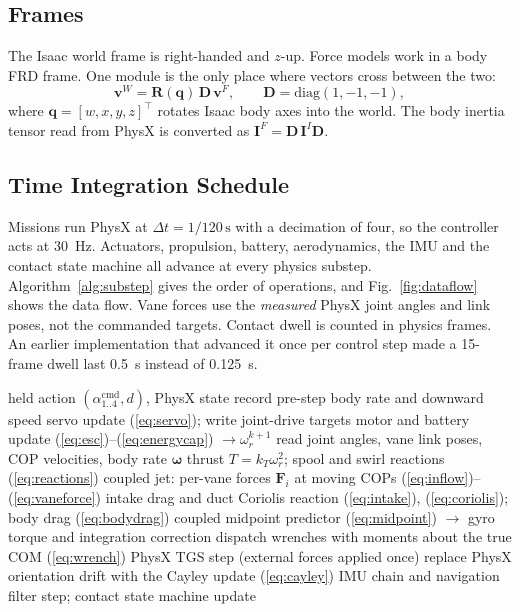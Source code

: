 \documentclass[journal]{IEEEtran}
\newcommand{\refalg}[1]{Algorithm~\ref{#1}}
\newcommand{\refeq}[1]{(\ref{#1})}
\newcommand{\reffig}[1]{Fig.~\ref{#1}}
\newcommand{\vect}[1]{\bm{#1}}
\newcommand{\mat}[1]{\mathbf{#1}}
\newcommand{\wb}{\vect{\omega}}
\newcommand{\wrot}{\omega_r}
\begin{document}
\subsection{Frames}
\label{sec:frames}

The Isaac world frame is right-handed and $z$-up.
Force models work in a body FRD frame.
One module is the only place where vectors cross between the two:
\begin{equation}
\vect{v}^{W} = \mat{R}(\vect{q})\,\mat{D}\,\vect{v}^{F}, \qquad \mat{D} = \mathrm{diag}(1,-1,-1),
\label{eq:frames}
\end{equation}
where $\vect{q} = [w,x,y,z]^\top$ rotates Isaac body axes into the world.
The body inertia tensor read from PhysX is converted as $\mat{I}^{F} = \mat{D}\,\mat{I}^{I}\mat{D}$.

\subsection{Time Integration Schedule}
\label{sec:schedule}

Missions run PhysX at $\Delta t = 1/120\,\si{\second}$ with a decimation of four, so the controller acts at \SI{30}{\hertz}.
Actuators, propulsion, battery, aerodynamics, the IMU and the contact state machine all advance at every physics substep.
\refalg{alg:substep} gives the order of operations, and \reffig{fig:dataflow} shows the data flow.
Vane forces use the \emph{measured} PhysX joint angles and link poses, not the commanded targets.
Contact dwell is counted in physics frames.
An earlier implementation that advanced it once per control step made a 15-frame dwell last \SI{0.5}{\second} instead of \SI{0.125}{\second}.

\begin{algorithm}[t]
\caption{One physics substep (\texttt{TVCDirectRLEnv})}
\label{alg:substep}
\footnotesize
\begin{algorithmic}[1]
\Require held action $(\alpha^{\text{cmd}}_{1..4}, d)$, PhysX state
\State record pre-step body rate and downward speed
\State servo update \refeq{eq:servo}; write joint-drive targets
\State motor and battery update \refeq{eq:esc}--\refeq{eq:energycap} $\to \wrot^{k+1}$
\State read joint angles, vane link poses, COP velocities, body rate $\wb$
\State thrust $T=k_T\wrot^2$; spool and swirl reactions \refeq{eq:reactions}
\State coupled jet: per-vane forces $\vect{F}_i$ at moving COPs \refeq{eq:inflow}--\refeq{eq:vaneforce}
\State intake drag and duct Coriolis reaction \refeq{eq:intake}, \refeq{eq:coriolis}; body drag \refeq{eq:bodydrag}
\State coupled midpoint predictor \refeq{eq:midpoint} $\to$ gyro torque and integration correction
\State dispatch wrenches with moments about the true COM \refeq{eq:wrench}
\State PhysX TGS step (external forces applied once)
 replace PhysX orientation drift with the Cayley update \refeq{eq:cayley}
\EndIf
\State IMU chain and navigation filter step; contact state machine update
\end{algorithmic}
\end{algorithm}
\end{document}
